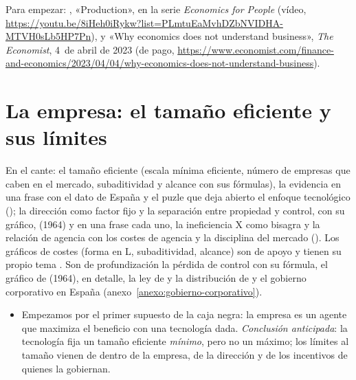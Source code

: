 \documentclass[11pt]{article}
\begin{document}
\begin{anotaciones}
Para empezar: , «Production», en la serie \emph{Economics for People} (vídeo, \url{https://youtu.be/8iHeh0iRykw?list=PLmtuEaMvhDZbNVIDHA-MTVH0sLb5HP7Pn}), y «Why economics does not understand business», \emph{The Economist}, 4~de abril de 2023 (de pago, \url{https://www.economist.com/finance-and-economics/2023/04/04/why-economics-does-not-understand-business}).
\end{anotaciones}


\section{La empresa: el tamaño eficiente y sus límites}\label{sec:tamano-limites}

\begin{notaopositor}
En el cante: el tamaño eficiente (escala mínima eficiente, número de empresas que caben en el mercado, subaditividad y alcance con sus fórmulas), la evidencia en una frase con el dato de España y el puzle que deja abierto el enfoque tecnológico (); la dirección como factor fijo y la separación entre propiedad y control,  con su gráfico,  (1964) y  en una frase cada uno, la ineficiencia X como bisagra y la relación de agencia con los costes de agencia y la disciplina del mercado (). Los gráficos de costes (forma en L, subaditividad, alcance) son de apoyo y tienen su propio tema . Son de profundización la pérdida de control con su fórmula, el gráfico de  (1964),  en detalle, la ley de  y la distribución de  y el gobierno corporativo en España (anexo~\ref{anexo:gobierno-corporativo}).
\end{notaopositor}

\begin{itemize}
\item Empezamos por el primer supuesto de la caja negra: la empresa es un agente que maximiza el beneficio con una tecnología dada. \emph{Conclusión anticipada}: la tecnología fija un tamaño eficiente \emph{mínimo}, pero no un máximo; los límites al tamaño vienen de dentro de la empresa, de la dirección y de los incentivos de quienes la gobiernan.
\end{itemize}

\end{document}
